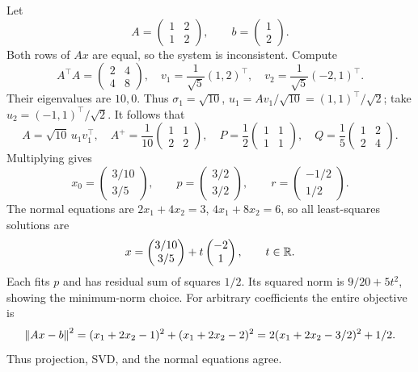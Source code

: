 \begin{example}\label{eg:10:dependent}
Let
\[
A=\begin{pmatrix}1&2\\1&2\end{pmatrix},\qquad b=\begin{pmatrix}1\\2\end{pmatrix}.
\]
Both rows of \(Ax\) are equal, so the system is inconsistent. Compute
\[
A^\top A=\begin{pmatrix}2&4\\4&8\end{pmatrix},
\quad v_1=\frac1{\sqrt5}(1,2)^\top,
\quad v_2=\frac1{\sqrt5}(-2,1)^\top.
\]
Their eigenvalues are \(10,0\). Thus \(\sigma_1=\sqrt{10}\),
\(u_1=Av_1/\sqrt{10}=(1,1)^\top/\sqrt2\); take
\(u_2=(-1,1)^\top/\sqrt2\). It follows that
\[
A=\sqrt{10}\,u_1v_1^\top,
\quad A^+=\frac1{10}\begin{pmatrix}1&1\\2&2\end{pmatrix},
\quad P=\frac12\begin{pmatrix}1&1\\1&1\end{pmatrix},
\quad Q=\frac15\begin{pmatrix}1&2\\2&4\end{pmatrix}.
\]
Multiplying gives
\[
x_0=\begin{pmatrix}3/10\\3/5\end{pmatrix},\qquad
p=\begin{pmatrix}3/2\\3/2\end{pmatrix},\qquad
r=\begin{pmatrix}-1/2\\1/2\end{pmatrix}.
\]
The normal equations are \(2x_1+4x_2=3\), \(4x_1+8x_2=6\), so all
least-squares solutions are
\[
x=\begin{pmatrix}3/10\\3/5\end{pmatrix}
+t\begin{pmatrix}-2\\1\end{pmatrix},\qquad t\in\mathbb R.
\]
Each fits \(p\) and has residual sum of squares \(1/2\).
Its squared norm is \(9/20+5t^2\), showing the minimum-norm choice.
For arbitrary coefficients the entire objective is
\[
\left\lVert Ax-b\right\rVert^2=(x_1+2x_2-1)^2+(x_1+2x_2-2)^2
=2(x_1+2x_2-3/2)^2+1/2.
\]
Thus projection, SVD, and the normal equations agree.
\end{example}

